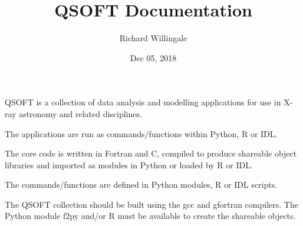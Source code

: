 \documentclass[letterpaper,10pt,english]{sphinxmanual}
\title{QSOFT Documentation}
\date{Dec 05, 2018}
\author{Richard Willingale}
\begin{document}
\pagestyle{empty}
\maketitle
\pagestyle{plain}
\sphinxtableofcontents
\pagestyle{normal}
\label{\detokenize{index::doc}}


QSOFT is a collection of data analysis and modelling applications for use in X-ray astronomy and related disciplines.

The applications are run as commands/functions within Python, R or IDL.

The core code is written in Fortran and C, compiled to produce shareable object libraries and imported as modules in Python or loaded by R or IDL.

The commands/functions are defined in Python modules, R or IDL scripts.

The QSOFT collection should be built using the gcc and gfortran compilers. The Python module f2py and/or R must be available to create the shareable objects.
\end{document}
